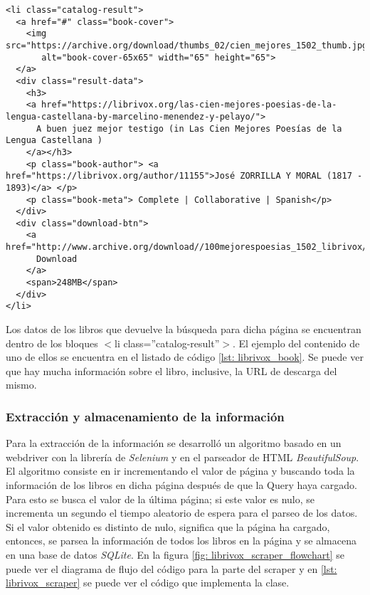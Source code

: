 \begin{lstlisting}[style=HTML,basicstyle=\tiny\ttfamily, caption={Ejemplo de la información contenida para uno de los libros},captionpos=b, label={lst: librivox_book}]
<li class="catalog-result">
  <a href="#" class="book-cover">
    <img src="https://archive.org/download/thumbs_02/cien_mejores_1502_thumb.jpg"
       alt="book-cover-65x65" width="65" height="65">
  </a>
  <div class="result-data">
    <h3>
    <a href="https://librivox.org/las-cien-mejores-poesias-de-la-lengua-castellana-by-marcelino-menendez-y-pelayo/">
      A buen juez mejor testigo (in Las Cien Mejores Poesías de la Lengua Castellana )
    </a></h3>
    <p class="book-author"> <a href="https://librivox.org/author/11155">José ZORRILLA Y MORAL (1817 - 1893)</a> </p>
    <p class="book-meta"> Complete | Collaborative | Spanish</p>
  </div>	
  <div class="download-btn">
    <a href="http://www.archive.org/download//100mejorespoesias_1502_librivox/100mejorespoesias_1502_librivox_64kb_mp3.zip">
      Download
    </a>
    <span>248MB</span>
  </div>
</li>
\end{lstlisting}
Los datos de los libros que devuelve la búsqueda para dicha página se encuentran dentro de los bloques \textcolor{editorBlue}{$<$}\textcolor{editorPink}{li class}\textcolor{editorBlue}{=}\textcolor{editorPurple}{''catalog-result''}\textcolor{editorBlue}{$>$}. El ejemplo del contenido de uno de ellos se encuentra en el listado de código \ref{lst: librivox_book}. Se puede ver que hay mucha información sobre el libro, inclusive, la \gls{URL} de descarga del mismo.
\subsubsection{Extracción y almacenamiento de la información}
Para la extracción de la información se desarrolló un algoritmo basado en un webdriver con la librería de \textit{Selenium} y en el parseador de \gls{HTML} \textit{BeautifulSoup}. El algoritmo consiste en ir incrementando el valor de página y buscando toda la información de los libros en dicha página después de que la Query haya cargado. Para esto se busca el valor de la última página; si este valor es nulo, se incrementa un segundo el tiempo aleatorio de espera para el parseo de los datos. Si el valor obtenido es distinto de nulo, significa que la página ha cargado, entonces, se parsea la información de todos los libros en la página y se almacena en una base de datos \textit{SQLite}. En la figura \ref{fig: librivox_scraper_flowchart} se puede ver el diagrama de flujo del código para la parte del scraper y en \ref{lst: librivox_scraper} se puede ver el código que implementa la clase.

